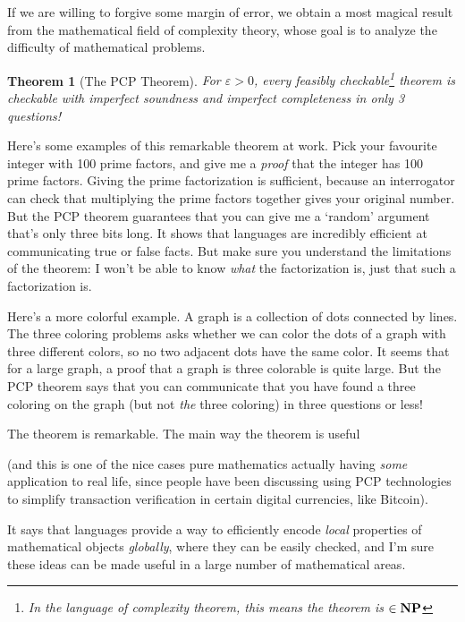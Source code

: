 \documentclass{article}
\theoremstyle{plain}
\newtheorem{theorem}{Theorem}
\theoremstyle{remark}
\theoremstyle{definition}
\begin{document}
\begin{multicols}{2}
If we are willing to forgive some margin of error, we obtain a most magical result from the mathematical field of complexity theory, whose goal is to analyze the difficulty of mathematical problems.

\begin{theorem}[The PCP Theorem]
    For $\varepsilon > 0$, every feasibly checkable\footnote{In the language of complexity theorem, this means the theorem is $\in {\bf NP}$} theorem is checkable with imperfect soundness and imperfect completeness in only 3 questions!
\end{theorem}

Here's some examples of this remarkable theorem at work. Pick your favourite integer with 100 prime factors, and give me a {\it proof} that the integer has 100 prime factors. Giving the prime factorization is sufficient, because an interrogator can check that multiplying the prime factors together gives your original number. But the PCP theorem guarantees that you can give me a `random' argument that's only three bits long. It shows that languages are incredibly efficient at communicating true or false facts. But make sure you understand the limitations of the theorem: I won't be able to know {\it what} the factorization is, just that such a factorization is.

Here's a more colorful example. A graph is a collection of dots connected by lines. The three coloring problems asks whether we can color the dots of a graph with three different colors, so no two adjacent dots have the same color. It seems that for a large graph, a proof that a graph is three colorable is quite large. But the PCP theorem says that you can communicate that you have found a three coloring on the graph (but not {\it the} three coloring) in three questions or less!

The theorem is remarkable. The main way the theorem is useful 

(and this is one of the nice cases pure mathematics actually having {\it some} application to real life, since people have been discussing using PCP technologies to simplify transaction verification in certain digital currencies, like Bitcoin).

It says that languages provide a way to efficiently encode {\it local} properties of mathematical objects {\it globally}, where they can be easily checked, and I'm sure these ideas can be made useful in a large number of mathematical areas.


\end{multicols}
\end{document}
